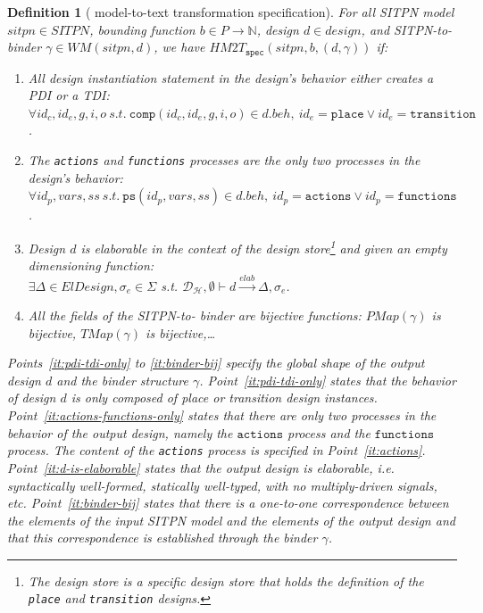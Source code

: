 \documentclass[pdflatex,sn-mathphys]{sn-jnl}%
\theoremstyle{thmstyleone}%
\theoremstyle{thmstyletwo}%
\theoremstyle{thmstylethree}%
\newtheorem{definition}{Definition}%
\begin{document}
\begin{definition}[\hilecop{} model-to-text transformation specification]
  \label{def:hm2t-spec}
  For all SITPN model $sitpn\in{}SITPN$, bounding function
  $b\in{}P\rightarrow\mathbb{N}$, \hvhdl{} design $d\in{}design$, and
  SITPN-to-\hvhdl{} binder $\gamma\in{}WM(sitpn,d)$, we have
  $HM2T_{\mathtt{spec}}(sitpn,b,(d,\gamma))$ if:
  \begin{enumerate}
  \item\label{it:pdi-tdi-only} All design instantiation statement in
    the design's behavior
    either creates a PDI or a TDI: \\
    $\forall{}id_c,id_e,g,i,o~s.t.~\mathtt{comp}(id_c,id_e,g,i,o)\in{}d.beh,~id_e=\mathtt{place}\lor{}id_e=\mathtt{transition}$.
    
  \item\label{it:actions-functions-only} The \texttt{actions} and
    \texttt{functions} processes are the
    only two processes in the design's behavior:\\
    $\forall{}id_p,vars,ss~s.t.~\mathtt{ps}(id_p,vars,ss)\in{}d.beh,~id_p=\mathtt{actions}\lor{}id_p=\mathtt{functions}$.
    
  \item\label{it:d-is-elaborable} Design $d$ is elaborable in the context of the \hilecop{} design store\footnote{The \hilecop{} design store is a specific design store that holds the definition of the \texttt{place} and \texttt{transition} designs.} and given an empty dimensioning function:\\
    $\exists{}\Delta\in{}ElDesign,\sigma_e\in\Sigma$ s.t.
    $\mathcal{D_\mathcal{H}},\emptyset\vdash{}d\xrightarrow{elab}\Delta,\sigma_e$.
    
  \item\label{it:binder-bij} All the fields of the SITPN-to-\hvhdl{} binder are bijective
    functions: $PMap(\gamma)$ is bijective, $TMap(\gamma)$ is
    bijective,\dots
  \end{enumerate}

  \bigskip
  
  Points~\ref{it:pdi-tdi-only} to \ref{it:binder-bij} specify the
  global shape of the output design $d$ and the binder structure
  $\gamma$.  Point~\ref{it:pdi-tdi-only} states that the behavior of
  design $d$ is only composed of place or transition design
  instances. Point~\ref{it:actions-functions-only} states that there
  are only two processes in the behavior of the output design, namely
  the $\mathtt{actions}$ process and the $\mathtt{functions}$
  process. The content of the \texttt{actions} process is specified in
  Point~\ref{it:actions}. Point~\ref{it:d-is-elaborable} states that
  the output design is elaborable, i.e. syntactically well-formed,
  statically well-typed, with no multiply-driven signals, etc.
  Point~\ref{it:binder-bij} states that there is a one-to-one
  correspondence between the elements of the input SITPN model and the
  elements of the output design and that this correspondence is
  established through the binder $\gamma$.


\end{definition}
\end{document}
